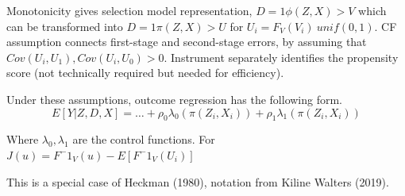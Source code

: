 Monotonicity gives selection model representation, $D = 1{ \phi(Z, X) > V }$ which can be transformed into $D = 1{ \pi(Z, X) > U }$ for $U_i = F_V(V_i) ~ unif(0, 1)$.
CF assumption connects first-stage and second-stage errors, by assuming that $Cov(U_i, U_1),Cov(U_i, U_0)  > 0$.
Instrument separately identifies the propensity score (not technically required but needed for efficiency).

Under these assumptions, outcome regression has the following form.
\[E[Y | Z, D, X] = … + \rho_0 \lambda_0( \pi(Z_i, X_i)) + \rho_1 \lambda_1( \pi(Z_i, X_i)) \]

Where $\lambda_0, \lambda_1$ are the control functions.
For $J(u) = F^-1_V(u) - E[ F^-1_V(U_i) ]$

This is a special case of Heckman (1980), notation from Kiline Walters (2019).

